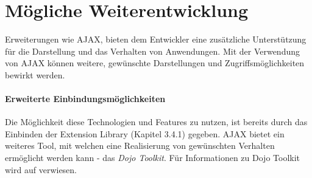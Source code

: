 \chapter{Mögliche Weiterentwicklung}


Erweiterungen wie AJAX, bieten dem Entwickler eine zusätzliche Unterstützung für die \linebreak Darstellung und das
Verhalten von Anwendungen.
Mit der Verwendung von AJAX können weitere, gewünschte Darstellungen und Zugriffsmöglichkeiten bewirkt werden.

\subsubsection{Erweiterte Einbindungsmöglichkeiten}
\label{sec:5ausblick}

Die Möglichkeit diese Technologien und Features zu nutzen, ist bereits durch das Einbinden der Extension Library (Kapitel 3.4.1) gegeben.
AJAX bietet ein weiteres Tool, mit welchen eine Realisierung von gewünschten Verhalten ermöglicht werden kann - das \textit{Dojo Toolkit}.\newline
Für Informationen zu Dojo Toolkit wird auf \cite{steyer} verwiesen.




